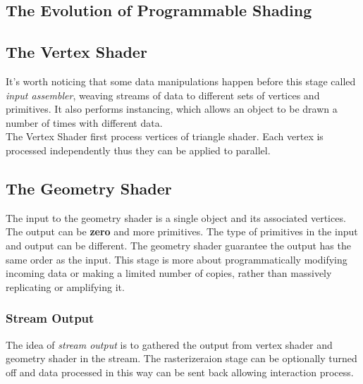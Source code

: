 \documentclass[10pt, a4paper]{article}
\begin{document}
        \subsection{The Evolution of Programmable Shading}
        
        \newpage

        \subsection{The Vertex Shader}
             It's worth noticing that some data manipulations happen before this stage called \emph{input assembler}, weaving streams of data to different sets of vertices and primitives. It also performs instancing, which allows an object to be drawn a number of times with different data. \\
             \indent The Vertex Shader first process vertices of triangle shader. Each vertex is processed independently thus they can be applied to parallel.
       
        \subsection{The Geometry Shader} 
            The input to the geometry shader is a single object and its associated vertices. The output can be \textbf{zero} and more primitives. The type of primitives in the input and output can be different. The geometry shader guarantee the output has the same order as the input. This stage is more about programmatically modifying incoming data or making a limited number of copies, rather than massively replicating or amplifying it.

            \subsubsection{Stream Output}
                The idea of \emph{stream output} is to gathered the output from vertex shader and geometry shader in the stream. The rasterizeraion stage can be optionally turned off and data processed in this way can be sent back allowing interaction process. 
        
\end{document}
